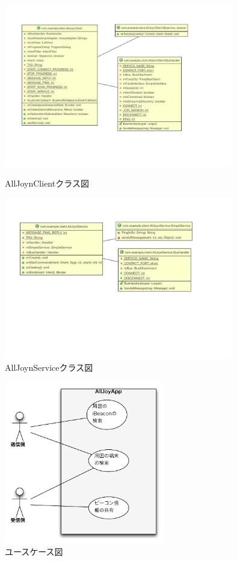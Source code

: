 \begin{figure}[htbp]
\begin{minipage}{0.5 \hsize}
\begin{center}
\includegraphics[width=10cm]{fig/class_client.pdf}
\end{center}
\caption{AllJoynClientクラス図}
\end{minipage}
\begin{minipage}{0.5 \hsize}
\begin{center}
\includegraphics[width=10cm]{fig/class_service.pdf}
\end{center}
\caption{AllJoynServiceクラス図}
\end{minipage}
\end{figure}

\begin{figure}[htbp]
\centering
\includegraphics[width=7cm]{fig/usecase.pdf}
\caption{ユースケース図}
\end{figure}

